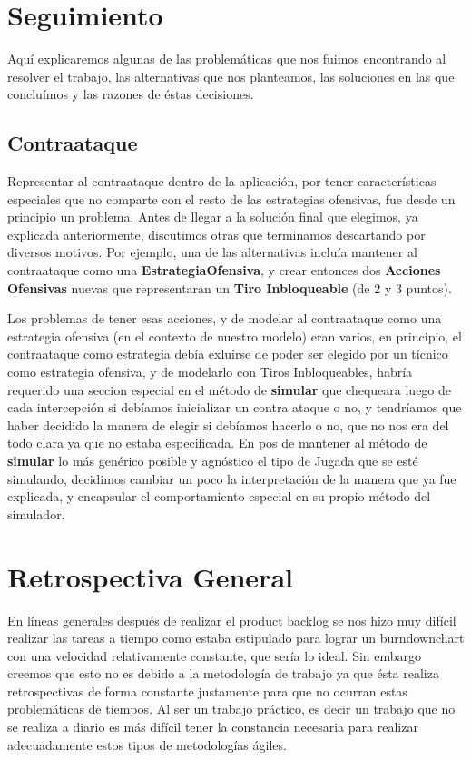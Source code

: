 \section{Seguimiento}

Aquí explicaremos algunas de las problemáticas que nos fuimos encontrando al resolver el trabajo, las alternativas que nos planteamos, las soluciones en las que concluímos y las razones de éstas decisiones.

\subsection{Contraataque}

Representar al contraataque dentro de la aplicación, por tener características especiales que no comparte con el resto de las estrategias ofensivas, fue desde un principio un problema. Antes de llegar a la solución final que elegimos, ya explicada anteriormente, discutimos otras que terminamos descartando por diversos motivos. Por ejemplo, una de las alternativas incluía mantener al contraataque como una \textbf{EstrategiaOfensiva}, y crear entonces dos \textbf{Acciones Ofensivas} nuevas que representaran un \textbf{Tiro Inbloqueable} (de 2 y 3 puntos). 

Los problemas de tener esas acciones, y de modelar al contraataque como una estrategia ofensiva (en el contexto de nuestro modelo) eran varios, en principio, el contraataque como estrategia debía exluirse de poder ser elegido por un tícnico como estrategia ofensiva, y de modelarlo con Tiros Inbloqueables, habría requerido una seccion especial en el método de \textbf{simular} que chequeara luego de cada intercepción si debíamos inicializar un contra ataque o no, y tendríamos que haber decidido la manera de elegir si debíamos hacerlo o no, que no nos era del todo clara ya que no estaba especificada. En pos de mantener al método de \textbf{simular} lo más genérico posible y agnóstico el tipo de Jugada que se esté simulando, decidimos cambiar un poco la interpretación de la manera que ya fue explicada, y encapsular el comportamiento especial en su propio método del simulador.

\section{Retrospectiva General}
En líneas generales después de realizar el product backlog se nos hizo muy difícil
realizar las tareas a tiempo como estaba estipulado para lograr un burndownchart
con una velocidad relativamente constante, que sería lo ideal. 
Sin embargo creemos que esto no es debido a la metodología de trabajo ya que 
ésta realiza retrospectivas de forma constante justamente para que 
no ocurran estas problemáticas de tiempos.
Al ser un trabajo práctico, es decir un trabajo que no se realiza a diario 
es más difícil tener la constancia necesaria
para realizar adecuadamente estos tipos de metodologías ágiles.
